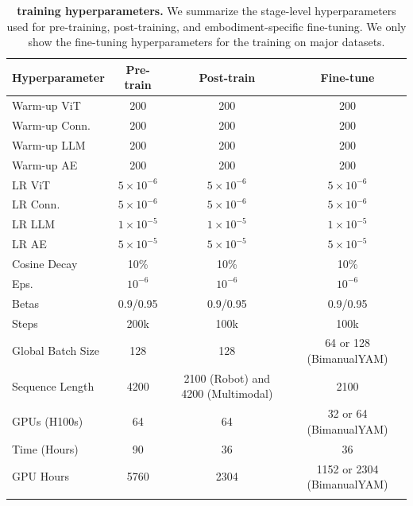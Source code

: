 
\begin{table}[!htbp]
\centering
\footnotesize
\setlength\tabcolsep{6pt}
\renewcommand\arraystretch{1.1}

\begin{tabular}{lccc}
\toprule
\textbf{Hyperparameter} &
\cellcolor{olive!5}\textbf{Pre-train} &
\cellcolor{olive!5}\textbf{Post-train} &
\cellcolor{olive!5}\textbf{Fine-tune} \\
\midrule
Warm-up ViT        & 200 & 200 & 200 \\
Warm-up Conn.      & 200 & 200 & 200 \\
Warm-up LLM        & 200 & 200 & 200 \\
Warm-up AE        & 200 & 200 & 200 \\
LR ViT             & $5{\times}10^{-6}$ & $5{\times}10^{-6}$ & $5{\times}10^{-6}$ \\
LR Conn.           & $5{\times}10^{-6}$ & $5{\times}10^{-6}$ & $5{\times}10^{-6}$ \\
LR LLM             & $1{\times}10^{-5}$ & $1{\times}10^{-5}$ & $1{\times}10^{-5}$ \\
LR AE             & $5{\times}10^{-5}$ & $5{\times}10^{-5}$ & $5{\times}10^{-5}$ \\
Cosine Decay       & 10\% & 10\% & 10\% \\
Eps.               & $10^{-6}$ & $10^{-6}$ & $10^{-6}$ \\
Betas              & 0.9/0.95 & 0.9/0.95 & 0.9/0.95 \\
Steps              & 200k & 100k & 100k \\
Global Batch Size  & 128 & 128 & 64 or 128 (BimanualYAM) \\
Sequence Length  & 4200 & 2100 (Robot) and 4200 (Multimodal) & 2100 \\
GPUs (H100s)       & 64 & 64 & 32 or 64 (BimanualYAM) \\
Time (Hours)       & 90 & 36 & 36 \\
GPU Hours          & 5760 & 2304 & 1152 or 2304 (BimanualYAM) \\
\addlinespace[2pt]  
\bottomrule
\end{tabular}
\caption{\textbf{\molmoactt training hyperparameters.} We summarize the
stage-level hyperparameters used for pre-training, post-training, and
embodiment-specific fine-tuning. We only show the fine-tuning hyperparameters for the training on major datasets.}
\label{tab:hyperparams_train}
\end{table}

